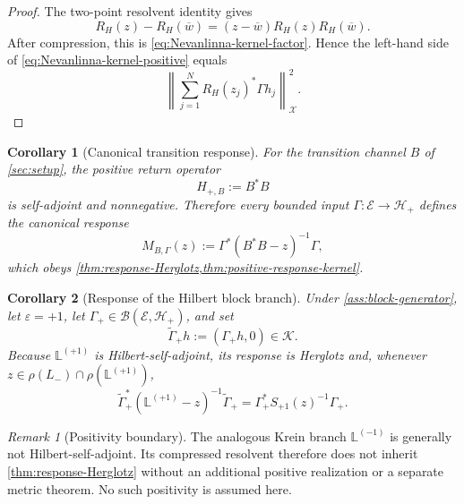 \documentclass[11pt,reqno]{scrartcl}
\newcommand{\scrK}{\mathscr K}
\newcommand{\scrHp}{\mathscr H_{+}}
\newcommand{\scrX}{\mathscr X}
\newcommand{\scrE}{\mathscr E}
\theoremstyle{plain}
\newtheorem{corollary}[corollary]{Corollary}
\theoremstyle{definition}
\theoremstyle{remark}
\newtheorem{remark}[remark]{Remark}
\begin{document}
\begin{proof}
The two-point resolvent identity gives
\begin{equation}
  R_H(z)-R_H(\overline w)
  =(z-\overline w)R_H(z)R_H(\overline w).
\end{equation}
After compression, this is \eqref{eq:Nevanlinna-kernel-factor}.  Hence the
left-hand side of \eqref{eq:Nevanlinna-kernel-positive} equals
\begin{equation}
  \left\|
  \sum_{j=1}^{N}R_H(z_j)^*\Gamma h_j
  \right\|_{\scrX}^{2}.
\end{equation}
\end{proof}

\begin{corollary}[Canonical transition response]
\label{cor:canonical-transition-response}
For the transition channel \(B\) of \cref{sec:setup}, the positive return
operator
\begin{equation}
  H_{+,B}:=B^*B
  \label{eq:positive-return-H}
\end{equation}
is self-adjoint and nonnegative.  Therefore every bounded input
\(\Gamma:\scrE\to\scrHp\) defines the canonical response
\begin{equation}
  M_{B,\Gamma}(z)
  :=\Gamma^*(B^*B-z)^{-1}\Gamma,
  \label{eq:canonical-transition-response}
\end{equation}
which obeys \cref{thm:response-Herglotz,thm:positive-response-kernel}.
\end{corollary}

\begin{corollary}[Response of the Hilbert block branch]
\label{cor:Hilbert-block-response}
Under \cref{ass:block-generator}, let \(\varepsilon=+1\), let
\(\Gamma_+\in\mathcal B(\scrE,\scrHp)\), and set
\begin{equation}
  \widetilde\Gamma_+h:=(\Gamma_+h,0)\in\scrK.
\end{equation}
Because \(\mathbb L^{(+1)}\) is Hilbert-self-adjoint, its response is
Herglotz and, whenever \(z\in\rho(L_-)\cap\rho(\mathbb L^{(+1)})\),
\begin{equation}
  \boxed{
  \widetilde\Gamma_+^*(\mathbb L^{(+1)}-z)^{-1}\widetilde\Gamma_+
  =\Gamma_+^*S_{+1}(z)^{-1}\Gamma_+.}
  \label{eq:Hilbert-block-response}
\end{equation}
\end{corollary}

\begin{remark}[Positivity boundary]
\label{rem:positivity-boundary}
The analogous Krein branch \(\mathbb L^{(-1)}\) is generally not
Hilbert-self-adjoint.  Its compressed resolvent therefore does not inherit
\cref{thm:response-Herglotz} without an additional positive realization or a
separate metric theorem.  No such positivity is assumed here.
\end{remark}
\end{document}
